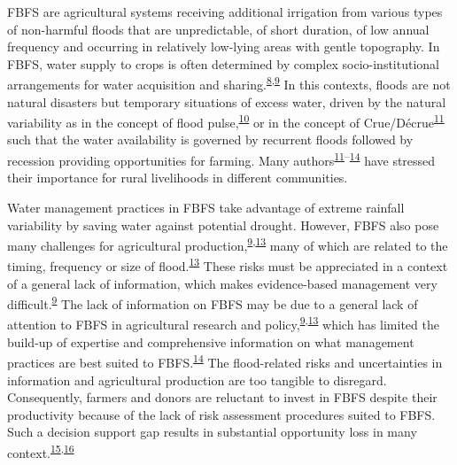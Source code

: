\documentclass[12pt,oneside]{article}
\begin{document}
FBFS are agricultural systems receiving additional irrigation from various types of non-harmful floods that are unpredictable, of short duration, of low annual frequency and occurring in relatively low-lying areas with gentle topography. In FBFS, water supply to crops is often determined by complex socio-institutional arrangements for water acquisition and sharing.\textsuperscript{\protect\hyperlink{ref-Haile_2010}{8},\protect\hyperlink{ref-VanSteenbergen_et_al_2010}{9}} In this contexts, floods are not natural disasters but temporary situations of excess water, driven by the natural variability as in the concept of flood pulse,\textsuperscript{\protect\hyperlink{ref-Junk_et_al_1989}{10}} or in the concept of Crue/Décrue\textsuperscript{\protect\hyperlink{ref-Harlan_Pasquereau_1969}{11}} such that the water availability is governed by recurrent floods followed by recession providing opportunities for farming. Many authors\textsuperscript{\protect\hyperlink{ref-Harlan_Pasquereau_1969}{11}--\protect\hyperlink{ref-VanSteenbergen_et_al_2011}{14}} have stressed their importance for rural livelihoods in different communities.

Water management practices in FBFS take advantage of extreme rainfall variability by saving water against potential drought. However, FBFS also pose many challenges for agricultural production,\textsuperscript{\protect\hyperlink{ref-VanSteenbergen_et_al_2010}{9},\protect\hyperlink{ref-Puertas_et_al_2011}{13}} many of which are related to the timing, frequency or size of flood.\textsuperscript{\protect\hyperlink{ref-Puertas_et_al_2011}{13}} These risks must be appreciated in a context of a general lack of information, which makes evidence-based management very difficult.\textsuperscript{\protect\hyperlink{ref-VanSteenbergen_et_al_2010}{9}} The lack of information on FBFS may be due to a general lack of attention to FBFS in agricultural research and policy,\textsuperscript{\protect\hyperlink{ref-VanSteenbergen_et_al_2010}{9},\protect\hyperlink{ref-Puertas_et_al_2011}{13}} which has limited the build-up of expertise and comprehensive information on what management practices are best suited to FBFS.\textsuperscript{\protect\hyperlink{ref-VanSteenbergen_et_al_2011}{14}} The flood-related risks and uncertainties in information and agricultural production are too tangible to disregard. Consequently, farmers and donors are reluctant to invest in FBFS despite their productivity because of the lack of risk assessment procedures suited to FBFS. Such a decision support gap results in substantial opportunity loss in many context.\textsuperscript{\protect\hyperlink{ref-Erkossa_et_al_2014}{15},\protect\hyperlink{ref-Hardaker_et_al_2015}{16}}
\end{document}
